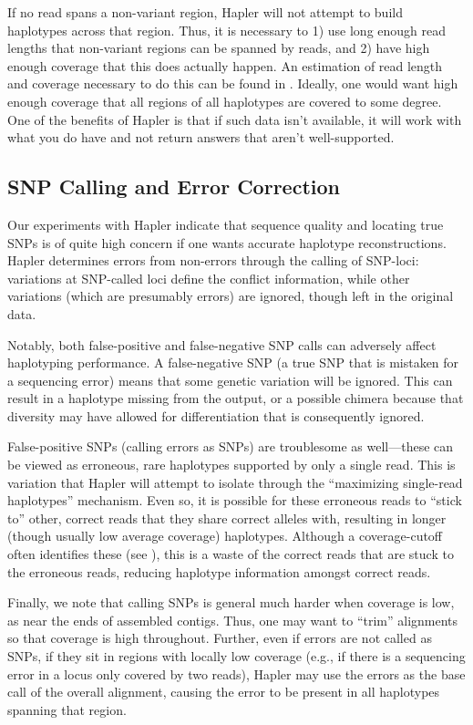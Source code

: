 \documentclass[11pt]{llncs}
\begin{document}
If no read spans a non-variant region, Hapler will not attempt to build haplotypes across that region. Thus, it is necessary to 1) use long enough
read lengths that non-variant regions can be spanned by reads, and 2) have high enough coverage that this does actually happen. An estimation of 
read length and coverage necessary to do this can be found in \cite{ERIKSSON2008}. Ideally, one would want high enough coverage that all regions
of all haplotypes are covered to some degree. One of the benefits of Hapler is that if such data isn't available, it will work with what you do have
and not return answers that aren't well-supported.

\subsection{SNP Calling and Error Correction}

Our experiments with Hapler indicate that sequence quality and locating true SNPs is of quite high concern if one wants accurate haplotype 
reconstructions. Hapler determines errors from non-errors through the calling of SNP-loci: variations at SNP-called loci define the conflict 
information, while other variations (which are presumably errors) are ignored, though left in the original data.

Notably, both false-positive and false-negative SNP calls can adversely affect haplotyping performance. A false-negative SNP (a true SNP that is 
mistaken for a sequencing error) means that some genetic variation will be ignored. This can result in a haplotype missing from the output, or a 
possible chimera because that diversity may have allowed for differentiation that is consequently ignored.

False-positive SNPs (calling errors as SNPs) are troublesome as well---these can be viewed as erroneous, rare haplotypes supported by only a single 
read. This is variation that Hapler will attempt to isolate through the ``maximizing single-read haplotypes'' mechanism. Even so, it is possible for 
these erroneous reads to ``stick to'' other, correct reads that they share correct alleles with, resulting in longer (though usually low average 
coverage) haplotypes. Although a coverage-cutoff often identifies these (see \cite{ONEIL2011}), this is a waste of the correct reads that are 
stuck to the erroneous reads, reducing haplotype information amongst correct reads.

Finally, we note that calling SNPs is general much harder when coverage is low, as near the ends of assembled contigs. Thus, one may want to 
``trim'' alignments so that coverage is high throughout. Further, even if errors are not called as SNPs, if they sit in regions with locally low 
coverage (e.g., if there is a sequencing error in a locus only covered by two reads), Hapler may use the errors as the base call of the overall 
alignment, causing the error to be present in all haplotypes spanning that region.
\end{document}
